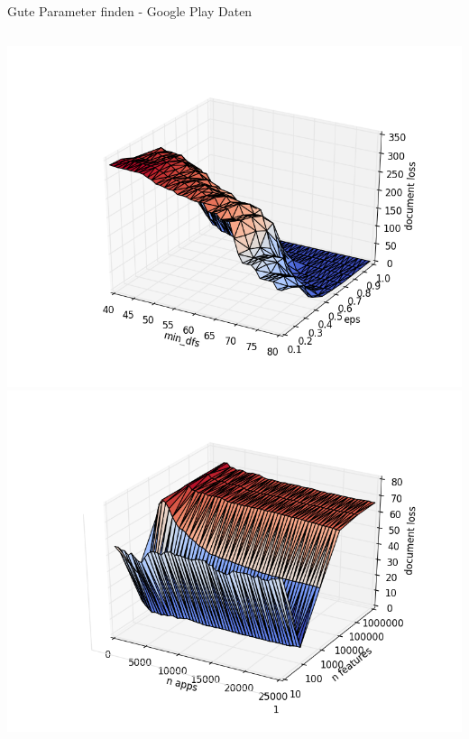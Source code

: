 \documentclass[compress,t]{beamer}
\begin{document}
\begin{frame}{Gute Parameter finden - Google Play Daten}

    \begin{columns}[t]
        \centering
        \includegraphics[width=1.0\textwidth]{img/gp_2_cosin.png}\\
        \includegraphics[width=1.0\textwidth]{img/features_3.png}
        \centering

\end{columns}
\end{frame}
\end{document}
